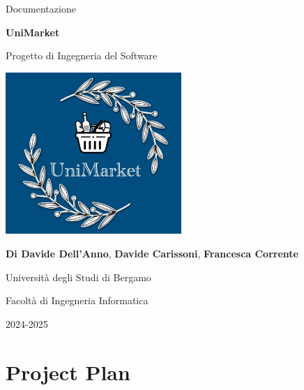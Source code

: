 \documentclass[a4paper,12pt]{article}
\begin{document}
\begin{titlepage}
    \centering
    \vspace*{2cm}
    
    \vspace{1.5cm}
    
    \large Documentazione

    \Huge
    \textbf{UniMarket}
    
    \vspace{1.5cm}
    
    \LARGE
    Progetto di Ingegneria del Software
    
    \vspace{1.5cm}
    \includegraphics[width=0.5\textwidth]{../Media/logo.jpeg}
    
    \vspace{1.5cm}
    \small
    \textbf{Di Davide Dell'Anno}, \textbf{Davide Carissoni}, \textbf{Francesca Corrente}
    
    \vspace{1.5cm}
    
    \Large
    Università degli Studi di Bergamo 

    Facoltà di Ingegneria Informatica 

    2024-2025
    
\end{titlepage}

\renewcommand{\contentsname}{Indice}
\tableofcontents
\newpage

\section{Project Plan}

\end{document}

